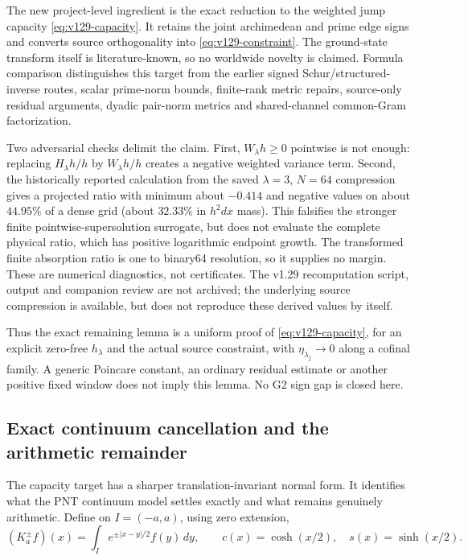 \documentclass[11pt]{article}
\theoremstyle{remark}
\begin{document}
The new project-level ingredient is the exact reduction to the
weighted jump capacity \eqref{eq:v129-capacity}. It retains the joint
archimedean and prime edge signs and converts source orthogonality into
\eqref{eq:v129-constraint}. The ground-state transform itself is
literature-known, so no worldwide novelty is claimed. Formula
comparison distinguishes this target from the earlier signed
Schur/structured-inverse routes, scalar prime-norm bounds, finite-rank
metric repairs, source-only residual arguments, dyadic pair-norm
metrics and shared-channel common-Gram factorization.

Two adversarial checks delimit the claim. First, $W_\lambda h\ge0$
pointwise is not enough: replacing $H_\lambda h/h$ by
$W_\lambda h/h$ creates a negative weighted variance term. Second,
the historically reported calculation from the saved $\lambda=3$, $N=64$
compression gives a projected ratio with
minimum about $-0.414$ and negative values on about $44.95\%$ of a
dense grid (about $32.33\%$ in $h^2dx$ mass). This falsifies the
stronger finite pointwise-supersolution surrogate, but does not
evaluate the complete physical ratio, which has positive logarithmic
endpoint growth. The transformed finite absorption ratio is one to
binary64 resolution, so it supplies no margin. These are numerical
diagnostics, not certificates. The v1.29 recomputation script, output
and companion review are not archived; the underlying source compression
is available, but does not reproduce these derived values by itself.

Thus the exact remaining lemma is a uniform proof of
\eqref{eq:v129-capacity}, for an explicit zero-free $h_\lambda$ and the
actual source constraint, with $\eta_{\lambda_j}\to0$ along a cofinal
family. A generic Poincare constant, an ordinary residual estimate or
another positive fixed window does not imply this lemma. No G2 sign
gap is closed here.

\subsection*{Exact continuum cancellation and the arithmetic remainder}

The capacity target has a sharper translation-invariant normal form.
It identifies what the PNT continuum model settles exactly and what
remains genuinely arithmetic. Define on $I=(-a,a)$, using zero
extension,
\[
 (K_a^\pm f)(x)=\int_I e^{\pm|x-y|/2}f(y)\,dy,\qquad
 c(x)=\cosh(x/2),\quad s(x)=\sinh(x/2).
\]
\end{document}
